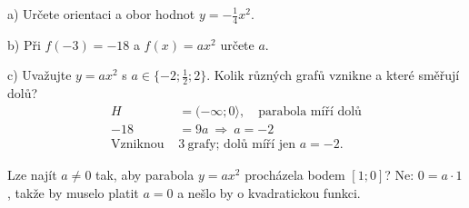 \documentclass[11pt,a4paper]{article}
\begin{document}
\begin{zadaniReseniBox}[title={Samostatná práce 1}]
a) Určete orientaci a obor hodnot $y=-\tfrac14x^2$.\par
b) Při $f(-3)=-18$ a $f(x)=ax^2$ určete $a$.\par
c) Uvažujte $y=ax^2$ s $a\in\{-2;\tfrac12;2\}$. Kolik různých grafů vznikne a které směřují dolů?
\tcblower
\[
\begin{aligned}
H&=(-\infty;0\rangle,\quad\text{parabola míří dolů} \\
-18&=9a\ \Rightarrow\ a=-2 \\
\text{Vzniknou }&3\ \text{grafy; dolů míří jen }a=-2.
\end{aligned}
\]

\end{zadaniReseniBox}
Lze najít $a\ne0$ tak, aby parabola $y=ax^2$ procházela bodem $[1;0]$? Ne: $0=a\cdot1$, takže by muselo platit $a=0$ a nešlo by o kvadratickou funkci.
\end{document}
